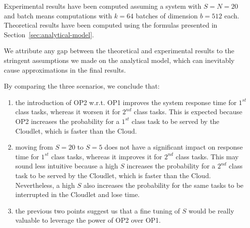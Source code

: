 Experimental results have been computed assuming a system with $S=N=20$ and batch means computations with $k=64$ batches of dimension $b=512$ each.
%
Theoretical results have been computed using the formulas presented in Section~\ref{sec:analytical-model}.

We attribute any gap between the theoretical and experimental results to the stringent assumptions we made on the analytical model, which can inevitably cause approximations in the final results.

By comparing the three scenarios, we conclude that:

\begin{enumerate}
	\item the introduction of OP2 w.r.t. OP1 improves the system response time for $1^{st}$ class tasks, whereas it worsen it for $2^{nd}$ class tasks. 
	This is expected because OP2 increases the probability for a $1^{st}$ class task to be served by the Cloudlet, which is faster than the Cloud.
	
	\item moving from $S=20$ to $S=5$ does not have a significant impact on response time for $1^{st}$ class tasks, whereas it improves it for $2^{nd}$ class tasks.
	This may sound less intuitive because a high $S$ increases the probability for a $2^{nd}$ class task to be served by the Cloudlet, which is faster than the Cloud. Nevertheless, a high $S$ also increases the probability for the same tasks to be interrupted in the Cloudlet and lose time.
	
	\item the previous two points suggest us that a fine tuning of $S$ would be really valuable to leverage the power of OP2 over OP1.
\end{enumerate}


